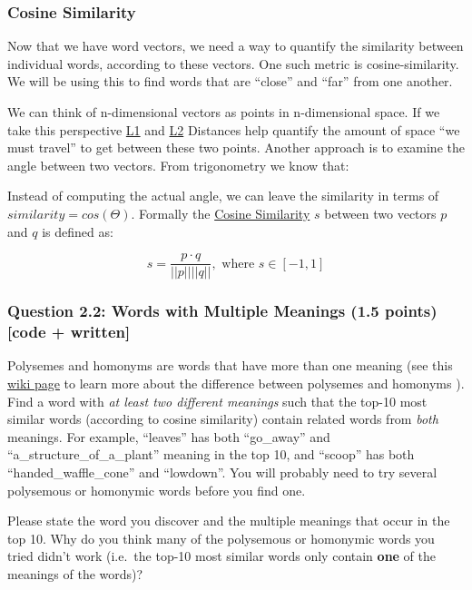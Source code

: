 \documentclass[11pt]{article}
\begin{document}
    \hypertarget{cosine-similarity}{%
\subsubsection{Cosine Similarity}\label{cosine-similarity}}

Now that we have word vectors, we need a way to quantify the similarity
between individual words, according to these vectors. One such metric is
cosine-similarity. We will be using this to find words that are
``close'' and ``far'' from one another.

We can think of n-dimensional vectors as points in n-dimensional space.
If we take this perspective
\href{http://mathworld.wolfram.com/L1-Norm.html}{L1} and
\href{http://mathworld.wolfram.com/L2-Norm.html}{L2} Distances help
quantify the amount of space ``we must travel'' to get between these two
points. Another approach is to examine the angle between two vectors.
From trigonometry we know that:

Instead of computing the actual angle, we can leave the similarity in
terms of \(similarity = cos(\Theta)\). Formally the
\href{https://en.wikipedia.org/wiki/Cosine_similarity}{Cosine
Similarity} \(s\) between two vectors \(p\) and \(q\) is defined as:

\[s = \frac{p \cdot q}{||p|| ||q||}, \textrm{ where } s \in [-1, 1] \]

    \hypertarget{question-2.2-words-with-multiple-meanings-1.5-points-code-written}{%
\subsubsection{Question 2.2: Words with Multiple Meanings (1.5 points)
{[}code +
written{]}}\label{question-2.2-words-with-multiple-meanings-1.5-points-code-written}}

Polysemes and homonyms are words that have more than one meaning (see
this \href{https://en.wikipedia.org/wiki/Polysemy}{wiki page} to learn
more about the difference between polysemes and homonyms ). Find a word
with \emph{at least two different meanings} such that the top-10 most
similar words (according to cosine similarity) contain related words
from \emph{both} meanings. For example, ``leaves'' has both ``go\_away''
and ``a\_structure\_of\_a\_plant'' meaning in the top 10, and ``scoop''
has both ``handed\_waffle\_cone'' and ``lowdown''. You will probably
need to try several polysemous or homonymic words before you find one.

Please state the word you discover and the multiple meanings that occur
in the top 10. Why do you think many of the polysemous or homonymic
words you tried didn't work (i.e.~the top-10 most similar words only
contain \textbf{one} of the meanings of the words)?
\end{document}
